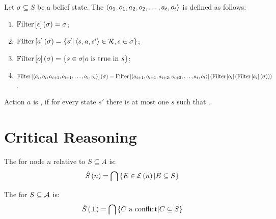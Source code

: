 \begin{defi}
Let $\sigma\subseteq S$ be a belief state. The  $\left\langle a_1,o_1,a_2,o_2,\ldots,a_t,o_t\right\rangle$ is defined as follows:
\begin{enumerate}
 \item $\mbox{Filter}\left[\epsilon\right]\left(\sigma\right)=\sigma$;
 \item $\mbox{Filter}\left[a\right]\left(\sigma\right)=\left\{ s'|\left\langle s,a,s'\right\rangle\in\mathcal{R},s\in\sigma\right\}$;
 \item $\mbox{Filter}\left[o\right]\left(\sigma\right)=\left\{ s\in\sigma|o\mbox{ is true in }s\right\}$;
 \item $\mbox{Filter}\left[\left\langle a_i,o_i,a_{i+1},o_{i+1},\ldots,a_t,o_t\right\rangle\right]\left(\sigma\right)=\mbox{Filter}\left[\left\langle a_{i+1},o_{i+1},a_{i+2},o_{i+2},\ldots,a_t,o_t\right\rangle\right]\left(\mbox{Filter}\left[o_i\right]\left(\mbox{Filter}\left[a_i\right]\left(\sigma\right)\right)\right)$.
\end{enumerate}
\cite{conf/ijcai/AmirR03}
\end{defi}


\begin{defi}
Action $a$ is , if for every state $s'$ there is at most one $s$ such that .
\cite{conf/ijcai/AmirR03}
\end{defi}

\section{Critical Reasoning}

\begin{defi}
The  for node $n$ relative to $S\subseteq A$ is:
\begin{equation}
\hat{S}\left(n\right)=\displaystyle\bigcap\left\{ E\in\mathcal{E}\left(n\right)|E\subseteq S\right\}
\end{equation}
\cite{conf/ijcai/RaimanKS93}
\end{defi}

\begin{defi}
The  for $S\subseteq\mathcal{A}$ is:
\begin{equation}
\hat{S}\left(\bot\right)=\displaystyle\bigcap\left\{ C\mbox{ a conflict}|C\subseteq S\right\}
\end{equation}
\cite{conf/ijcai/RaimanKS93}
\end{defi}


